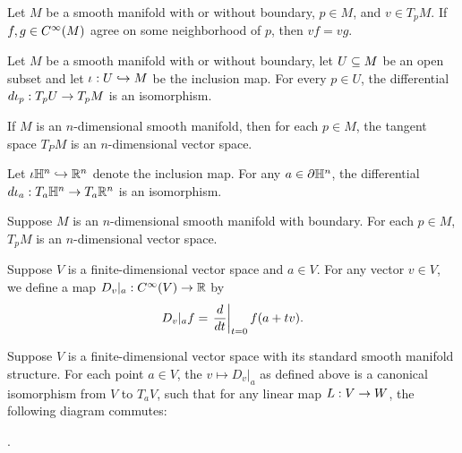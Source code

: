\setcounter{thm}{7}

\begin{prop}
Let $M$ be a smooth manifold with or without boundary, $p\in M$, and $v\in T_pM$. If $f,g\in C^\infty(M)$ agree on some neighborhood of $p$, then $vf = vg$.
\end{prop}

\begin{prop}
Let $M$ be a smooth manifold with or without boundary, let $U\subseteq M$ be an open subset and let $\iota:U\hookrightarrow M$ be the inclusion map. For every $p\in U$, the differential $d\iota_p:T_pU\rightarrow T_pM$ is an isomorphism.
\end{prop}

\begin{prop}
If $M$ is an $n$-dimensional smooth manifold, then for each $p\in M$, the tangent space $T_PM$ is an $n$-dimensional vector space.
\end{prop}

\begin{lem}
Let $\iota\mathbb{H}^n\hookrightarrow \mathbb{R}^n$ denote the inclusion map. For any $a\in \partial \mathbb{H}^n$, the differential $d\iota_a:T_a\mathbb{H}^n\rightarrow T_a\mathbb{R}^n$ is an isomorphism.
\end{lem}

\begin{prop}
Suppose $M$ is an $n$-dimensional smooth manifold with boundary. For each $p\in M$, $T_pM$ is an $n$-dimensional vector space.
\end{prop}

\dfn Suppose $V$ is a finite-dimensional vector space and $a\in V$. For any vector $v\in V$, we define a map $D_v|_a:C^\infty(V) \rightarrow \mathbb{R}$ by
\[D_v|_a f = \left. \frac{d}{dt}\right|_{t=0}f(a + tv).\]

\begin{prop}
Suppose $V$ is a finite-dimensional vector space with its standard smooth manifold structure. For each point $a\in V$, the $v\mapsto D_v|_a$ as defined above is a canonical isomorphism from $V$ to $T_aV$, such that for any linear map $L:V\rightarrow W$, the following diagram commutes:
\begin{center}
.
\end{center}
\end{prop}

